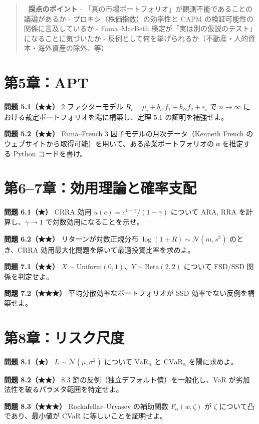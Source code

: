 \documentclass[11pt,a4paper]{report}
\begin{document}
\begin{quote}
📝 \textbf{採点のポイント}
- 「真の市場ポートフォリオ」が観測不能であることの議論があるか
- プロキシ（株価指数）の効率性と CAPM の検証可能性の関係に言及しているか
- Fama–MacBeth 検定が「実は別の仮説のテスト」になることに気づいたか
- 反例として何を挙げられるか（不動産・人的資本・海外資産の除外、等）
\end{quote}

\section{第5章：APT}

\textbf{問題 5.1（★★）} 2 ファクターモデル $R_i = \mu_i + b_{i1} f_1 + b_{i2} f_2 + \varepsilon_i$ で $n \to \infty$ における裁定ポートフォリオを陽に構築し、定理 5.1 の証明を補強せよ。

\textbf{問題 5.2（★★）} Fama–French 3 因子モデルの月次データ（Kenneth French のウェブサイトから取得可能）を用いて、ある産業ポートフォリオの α を推定する Python コードを書け。

\section{第6–7章：効用理論と確率支配}

\textbf{問題 6.1（★）} CRRA 効用 $u(c) = c^{1-\gamma}/(1-\gamma)$ について ARA, RRA を計算し、$\gamma \to 1$ で対数効用になることを示せ。

\textbf{問題 6.2（★★）} リターンが対数正規分布 $\log(1 + R) \sim \mathcal{N}(m, s^2)$ のとき、CRRA 効用最大化問題を解いて最適投資比率を求めよ。

\textbf{問題 7.1（★★）} $X \sim \mathrm{Uniform}(0,1)$、$Y \sim \mathrm{Beta}(2, 2)$ について FSD/SSD 関係を判定せよ。

\textbf{問題 7.2（★★★）} 平均分散効率なポートフォリオが SSD 効率でない反例を構築せよ。

\section{第8章：リスク尺度}

\textbf{問題 8.1（★）} $L \sim \mathcal{N}(\mu, \sigma^2)$ について $\mathrm{VaR}_\alpha$ と $\mathrm{CVaR}_\alpha$ を陽に求めよ。

\textbf{問題 8.2（★★）} 8.3 節の反例（独立デフォルト債）を一般化し、VaR が劣加法性を破るパラメタ範囲を特定せよ。

\textbf{問題 8.3（★★★）} Rockafellar–Uryasev の補助関数 $F_\alpha(w, \zeta)$ が $\zeta$ について凸であり、最小値が CVaR に等しいことを証明せよ。
\end{document}
